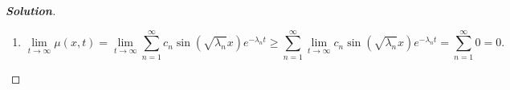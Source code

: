 \documentclass[letterpaper,11pt]{article} %
\theoremstyle{plain}
\begin{document}
\begin{proof}[\textbf{Solution}]
\begin{enumerate}[label=\alph*.)]
        The formal solution to the given heat problem can therefore be expressed as
        \begin{equation*}
        \mu(x, t) = \sum_{n=1}^\infty c_n \sin(\sqrt{\lambda_n}x) e^{-\lambda_n t}.
        \end{equation*}
        Since $\mu(x, 0) = f(x) = 75$,
        \begin{align*}
            \mu(x, 0) = \sum_{n=1}^\infty c_n \sin(\sqrt{\lambda_n}x) &= f(x) = 75
            \shortintertext{so}
            c_n = \frac{\displaystyle \int_0^1 f(x) X_n(x)\,\mathrm{d}x}{\displaystyle\int_0^1 X^2_n(x)\,\mathrm{d}x} &= \frac{\displaystyle 75\int_0^1  \sin(\sqrt{\lambda_n}x)\,\mathrm{d}x}{\displaystyle\int_0^1 \sin^2(\sqrt{\lambda_n}x)\,\mathrm{d}x} = \frac{\displaystyle \frac{75}{\sqrt{\lambda_n}}\left.\cos(\sqrt{\lambda_n}x)\right|_0^1}{\displaystyle \int_0^1 \left(\frac{1}{2} - \frac{1}{2} \cos(2\sqrt{\lambda_n}x)\right)\,\mathrm{d}x} \\
            &= \frac{\displaystyle \frac{75}{\sqrt{\lambda_n}}\left(\cos(\sqrt{\lambda_n} )- 1\right)}{\displaystyle \frac{1}{2} - \frac{1}{4\sqrt{\lambda_n}}\left.\sin(2\sqrt{\lambda_n}x)\right|_0^1 } = \frac{\displaystyle \frac{75}{\sqrt{\lambda_n}}\left(\cos(\sqrt{\lambda_n} )- 1\right)}{\displaystyle \frac{1}{2} - \frac{1}{4\sqrt{\lambda_n}}\sin(2\sqrt{\lambda_n})} \tag{$\ast$}
        \end{align*}
        The complete solution is therefore
        \begin{equation*}
         \boxed{\mu(x, t) = \sum_{n=1}^\infty \left(\frac{\displaystyle 75\left(\cos(\sqrt{\lambda_n} )- 1\right)}{\displaystyle \frac{\sqrt{\lambda_n}}{2} - \frac{1}{4}\sin(2\sqrt{\lambda_n})} \right)\sin(\sqrt{\lambda_n}x) e^{-\lambda_n t}}.
        \end{equation*}
        where the eigenvalues $\lambda_n$ satisfy the transcendental equation $\tan(\sqrt{\lambda_n}) = -\sqrt{\lambda_n}$.
        
        \item \begin{equation*}
        \lim\limits_{t \to \infty} \mu(x, t) =  \lim\limits_{t \to \infty}\sum_{n=1}^\infty c_n \sin(\sqrt{\lambda_n}x) e^{-\lambda_n t} \geq \sum_{n=1}^\infty \lim\limits_{t \to \infty} c_n \sin(\sqrt{\lambda_n}x) e^{-\lambda_n t} = \sum_{n=1}^\infty 0 = \boxed{0}.
        \end{equation*}
        

\end{enumerate}
\end{proof}
\end{document}
